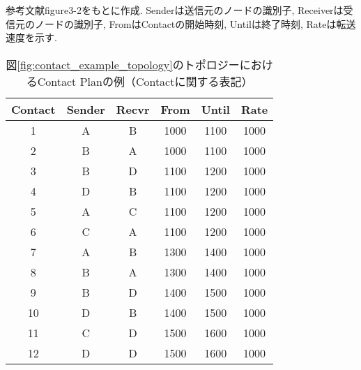 \begin{table}[htbp]
    \centering
    \caption{図\ref{fig:contact_example_topology}のトポロジーにおけるContact Planの例（Contactに関する表記）}
    \label{table:contact_example_contactplan}
    \begin{minipage}{\textwidth}
        \raggedright
        \vspace{2mm}
        \fontsize{10.5pt}{12pt}\selectfont
        参考文献\cite{schedule_aware_bundle_routing}figure3-2をもとに作成. 
        Senderは送信元のノードの識別子, Receiverは受信元のノードの識別子, FromはContactの開始時刻, Untilは終了時刻, Rateは転送速度を示す.  
        \vspace{2mm}
    \end{minipage}
    \begin{tabular}{cccccc}
      \hline
      Contact & Sender & Recvr & From & Until & Rate \\
      \hline
      1 & A & B & 1000 & 1100 & 1000 \\
      2 & B & A & 1000 & 1100 & 1000 \\
      3 & B & D & 1100 & 1200 & 1000 \\
      4 & D & B & 1100 & 1200 & 1000 \\
      5 & A & C & 1100 & 1200 & 1000 \\
      6 & C & A & 1100 & 1200 & 1000 \\
      7 & A & B & 1300 & 1400 & 1000 \\
      8 & B & A & 1300 & 1400 & 1000 \\
      9 & B & D & 1400 & 1500 & 1000 \\
      10 & D & B & 1400 & 1500 & 1000 \\
      11 & C & D & 1500 & 1600 & 1000 \\
      12 & D & D & 1500 & 1600 & 1000 \\
      \hline
    \end{tabular}
\end{table}
